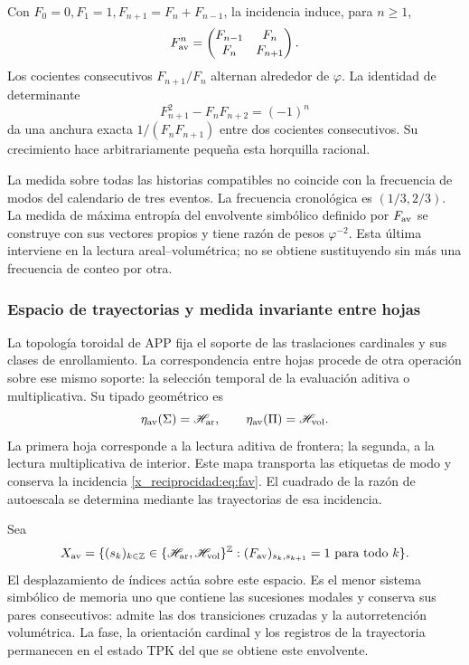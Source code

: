 Con \(F_0=0,F_1=1,F_{n+1}=F_n+F_{n-1}\), la incidencia induce, para \(n\geq1\),
\[
 F_{\rm av}^n=\begin{pmatrix}F_{n-1}&F_n\\F_n&F_{n+1}\end{pmatrix}.
\]
Los cocientes consecutivos \(F_{n+1}/F_n\) alternan alrededor de \(\varphi\). La identidad de determinante
\[
 F_{n+1}^2-F_nF_{n+2}=(-1)^n
\]
da una anchura exacta \(1/(F_nF_{n+1})\) entre dos cocientes consecutivos. Su crecimiento hace arbitrariamente pequeña esta horquilla racional.

La medida sobre todas las historias compatibles no coincide con la frecuencia de modos del calendario de tres eventos. La frecuencia cronológica es \((1/3,2/3)\). La medida de máxima entropía del envolvente simbólico definido por \(F_{\rm av}\) se construye con sus vectores propios y tiene razón de pesos \(\varphi^{-2}\). Esta última interviene en la lectura areal--volumétrica; no se obtiene sustituyendo sin más una frecuencia de conteo por otra.


\subsubsection{Espacio de trayectorias y medida invariante entre hojas}
\label{x_reciprocidad:sec:medida-retorno-hojas}

La topología toroidal de APP fija el soporte de las traslaciones cardinales
y sus clases de enrollamiento. La correspondencia entre hojas procede de
otra operación sobre ese mismo soporte: la selección temporal de la
evaluación aditiva o multiplicativa. Su tipado geométrico es
\[
 \eta_{\rm av}(\Sigma)=\mathscr H_{\rm ar},\qquad
 \eta_{\rm av}(\Pi)=\mathscr H_{\rm vol}.
\]
La primera hoja corresponde a la lectura aditiva de frontera; la segunda,
a la lectura multiplicativa de interior. Este mapa transporta las etiquetas
de modo y conserva la incidencia \eqref{x_reciprocidad:eq:fav}. El cuadrado de la razón
de autoescala se determina mediante las trayectorias de esa incidencia.

\begin{definition}
Sea
\[
 X_{\rm av}=\{(s_k)_{k\in\mathbb Z}\in
 \{\mathscr H_{\rm ar},\mathscr H_{\rm vol}\}^{\mathbb Z}:
 (F_{\rm av})_{s_k,s_{k+1}}=1\text{ para todo }k\}.
\]
El desplazamiento de índices actúa sobre este espacio. Es el menor sistema
simbólico de memoria uno que contiene las sucesiones modales y conserva
sus pares consecutivos: admite las dos transiciones cruzadas y la
autorretención volumétrica. La fase, la orientación cardinal y los registros
de la trayectoria permanecen en el estado TPK del que se obtiene este
envolvente.
\end{definition}

